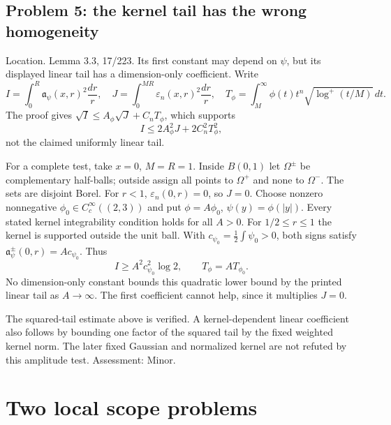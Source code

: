 \documentclass[10pt]{article}
\begin{document}
\subsection*{Problem 5: the kernel tail has the wrong homogeneity}
Location. Lemma 3.3, 17/223. Its first constant may depend on \(\psi\), but its displayed linear tail has a dimension-only coefficient. Write \[I=\int_0^R\mathfrak a_\psi(x,r)^2\frac{dr}{r},\quad
 J=\int_0^{MR}\varepsilon_n(x,r)^2\frac{dr}{r},\quad
 T_\phi=\int_M^\infty\phi(t)t^n\sqrt{\log^+(t/M)}\,dt.\] The proof gives \(\sqrt I\le A_\phi\sqrt J+C_nT_\phi\), which supports \[I\le2A_\phi^2J+2C_n^2T_\phi^2,\] not the claimed uniformly linear tail.\par
For a complete test, take \(x=0\), \(M=R=1\). Inside \(B(0,1)\) let \(\Omega^\pm\) be complementary half-balls; outside assign all points to \(\Omega^+\) and none to \(\Omega^-\). The sets are disjoint Borel. For \(r<1\), \(\varepsilon_n(0,r)=0\), so \(J=0\). Choose nonzero nonnegative \(\phi_0\in C_c^\infty((2,3))\) and put \(\phi=A\phi_0\), \(\psi(y)=\phi(|y|)\). Every stated kernel integrability condition holds for all \(A>0\). For \(1/2\le r\le1\) the kernel is supported outside the unit ball. With \(c_{\psi_0}=\frac12\int\psi_0>0\), both signs satisfy \(\mathfrak a_\psi^\pm(0,r)=A c_{\psi_0}\). Thus \[I\ge A^2c_{\psi_0}^2\log2,\qquad T_\phi=A T_{\phi_0}.\] No dimension-only constant bounds this quadratic lower bound by the printed linear tail as \(A\to\infty\). The first coefficient cannot help, since it multiplies \(J=0\).\par
The squared-tail estimate above is verified. A kernel-dependent linear coefficient also follows by bounding one factor of the squared tail by the fixed weighted kernel norm. The later fixed Gaussian and normalized kernel are not refuted by this amplitude test. Assessment: Minor.\par
\section*{Two local scope problems}
\end{document}
